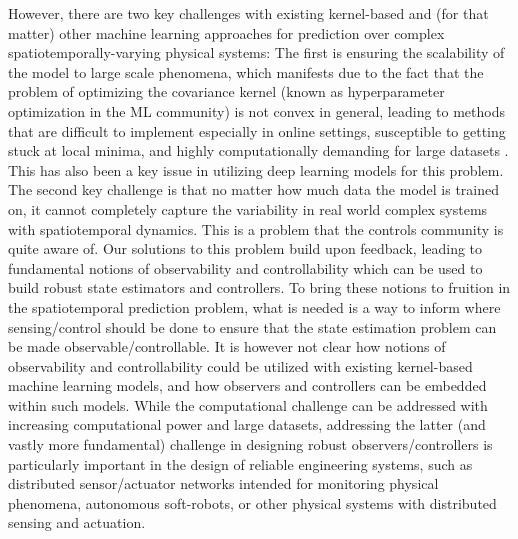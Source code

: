However, there are two key challenges with existing kernel-based and (for that matter) other machine learning approaches for prediction over complex spatiotemporally-varying physical systems: The first is ensuring the scalability of the model to large scale phenomena, which manifests due to the fact that the problem of optimizing the covariance kernel (known as hyperparameter optimization in the ML community) is not convex in general, leading to methods that are difficult to implement especially in online settings, susceptible to getting stuck at local minima, and highly computationally demanding for large datasets \cite{sra2012optimization}. This has also been a key issue in utilizing deep learning models for this problem. %
The second key challenge is that no matter how much data the model is trained on, it cannot completely capture the variability in real world complex systems with spatiotemporal dynamics. This is a problem that the controls community is quite aware of. Our solutions to this problem build upon feedback, leading to fundamental notions of observability and controllability which can be used to build robust state estimators and controllers. To bring these notions to fruition in the spatiotemporal prediction problem, what is needed is a way to inform where sensing/control should be done to ensure that the state estimation problem can be made observable/controllable. %
It is however not clear how notions of observability and controllability could be utilized with existing kernel-based machine learning models, and how observers and controllers can be embedded within such models. %
While the computational challenge can be addressed with increasing computational power and large datasets, addressing the latter (and vastly more fundamental) challenge in designing robust observers/controllers is particularly important in the design of reliable engineering systems, such as distributed sensor/actuator networks intended for monitoring physical phenomena, autonomous soft-robots, or other physical systems with distributed sensing and actuation.  %
% 
   
